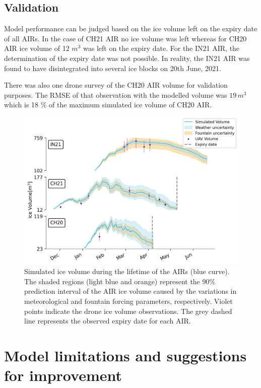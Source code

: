 \subsection{Validation}

Model performance can be judged based on the ice volume left on the expiry date of all \ac{AIRs}. In the case of CH21
AIR no ice volume was left whereas for CH20 AIR ice volume of 12 $m^3$ was left on the expiry date. For the IN21
AIR, the determination of the expiry date was not possible. In reality, the IN21 AIR was found to have
disintegrated into several ice blocks on 20th June, 2021.

There was also one drone survey of the CH20 AIR volume for validation purposes. The RMSE of that observation
with the modelled volume was $19\, m^3$ which is 18 \% of the maximum simulated ice volume of CH20 AIR.

\begin{figure}
	\centering
	\includegraphics[width=\linewidth]{figs/model_validation.jpg}
	\caption{Simulated ice volume during the lifetime of the \ac{AIRs} (blue curve). The shaded regions (light blue and
		orange) represent the 90\% prediction interval of the AIR ice volume caused by the variations in meteorological and
		fountain forcing parameters, respectively. Violet points indicate the drone ice volume observations.  The grey
		dashed line represents the observed expiry date for each AIR.  }
	\label{fig:results}
\end{figure}


\section{Model limitations and suggestions for improvement}

